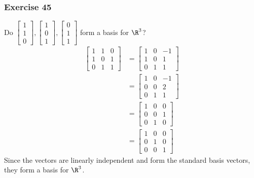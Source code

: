 \documentclass[letterpaper, 12pt]{math}
\begin{document}
\subsubsection*{Exercise 45}
Do \( \begin{bmatrix}1 \\ 1 \\ 0\end{bmatrix},\begin{bmatrix}1 \\ 0 \\ 1
\end{bmatrix},\begin{bmatrix}0 \\ 1 \\ 1\end{bmatrix} \) form a basis for
\( \R^3 \)?
\begin{align*}
  \begin{bmatrix}
    1 & 1 & 0 \\
    1 & 0 & 1 \\
    0 & 1 & 1
  \end{bmatrix} &= \begin{bmatrix}
    1 & 0 & -1 \\
    1 & 0 & 1 \\
    0 & 1 & 1
  \end{bmatrix} \\
  &= \begin{bmatrix}
    1 & 0 & -1 \\
    0 & 0 & 2 \\
    0 & 1 & 1
  \end{bmatrix} \\
  &= \begin{bmatrix}
    1 & 0 & 0 \\
    0 & 0 & 1 \\
    0 & 1 & 0
  \end{bmatrix} \\
  &= \begin{bmatrix}
    1 & 0 & 0 \\
    0 & 1 & 0 \\
    0 & 0 & 1
  \end{bmatrix}
\end{align*}
Since the vectors are linearly independent and form the standard basis vectors,
they form a basis for \( \R^3 \).
\end{document}
